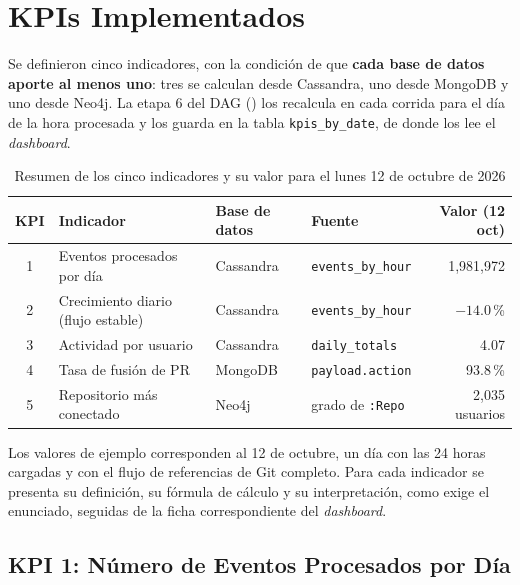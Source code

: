 \section{KPIs Implementados}
\label{sec:kpis}

Se definieron cinco indicadores, con la condición de que \textbf{cada base de datos aporte al menos uno}: tres se calculan desde Cassandra, uno desde MongoDB y uno desde Neo4j. La etapa 6 del DAG () los recalcula en cada corrida para el día de la hora procesada y los guarda en la tabla \texttt{kpis\_by\_date}, de donde los lee el \textit{dashboard}.

\begin{table}[H]
\centering
\caption{Resumen de los cinco indicadores y su valor para el lunes 12 de octubre de 2026}
\label{tab:kpis}
\vspace{0.2cm}
\footnotesize
\begin{tabular}{@{}clllr@{}}
\toprule
\textbf{KPI} & \textbf{Indicador} & \textbf{Base de datos} & \textbf{Fuente} & \textbf{Valor (12 oct)} \\
\midrule
1 & Eventos procesados por día       & Cassandra & \texttt{events\_by\_hour}          & 1,981,972 \\
2 & Crecimiento diario (flujo estable) & Cassandra & \texttt{events\_by\_hour}          & $-14.0$\,\% \\
3 & Actividad por usuario & Cassandra & \texttt{daily\_totals}            & 4.07 \\
4 & Tasa de fusión de PR & MongoDB & \texttt{payload.action}       & 93.8\,\% \\
5 & Repositorio más conectado        & Neo4j     & grado de \texttt{:Repo}       & 2,035 usuarios \\
\bottomrule
\end{tabular}
\end{table}

Los valores de ejemplo corresponden al 12 de octubre, un día con las 24 horas cargadas y con el flujo de referencias de Git completo. Para cada indicador se presenta su definición, su fórmula de cálculo y su interpretación, como exige el enunciado, seguidas de la ficha correspondiente del \textit{dashboard}.

\subsection{KPI 1: Número de Eventos Procesados por Día}

